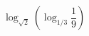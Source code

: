 \begin{ex}[type=calculate]
	\begin{condition}
		\( \log_{\sqrt{2}}\left( \log_{1/3}\dfrac{1}{9} \right) \)
	\end{condition}
\end{ex}